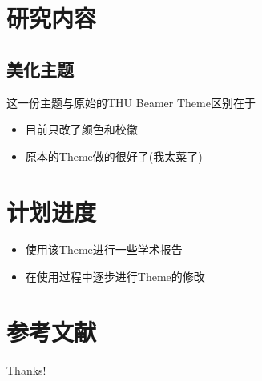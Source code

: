 \documentclass{beamer}
\begin{document}
\section{研究内容}

\subsection{美化主题}

\begin{frame}{这一份主题与原始的THU Beamer Theme区别在于}
\begin{itemize}
\item 目前只改了颜色和校徽
\item 原本的Theme做的很好了(我太菜了)
\end{itemize}
\end{frame}

\section{计划进度}
\begin{frame}
	\begin{itemize}
\item 使用该Theme进行一些学术报告
\item 在使用过程中逐步进行Theme的修改
	\end{itemize}
\end{frame}

\section{参考文献}

\begin{frame}[allowframebreaks]


\end{frame}

\begin{frame}
\begin{center}
{\Huge Thanks!}
\end{center}
\end{frame}
\end{document}
